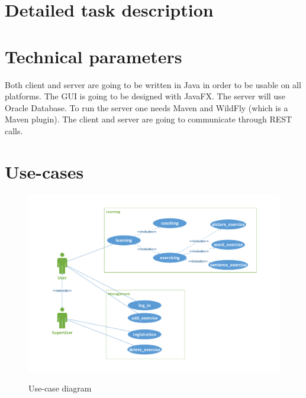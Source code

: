 \documentclass[a4paper]{article}
\begin{document}
	\section{Detailed task description}
	
	\section{Technical parameters}
	Both client and server are going to be written in Java in order to be usable on all platforms. The GUI is going to be designed with JavaFX. The server will use Oracle Database. To run the server one needs Maven and WildFly (which is a Maven plugin). The client and server are going to communicate through REST calls.
	
	\section{Use-cases}
	\begin{figure}[htbp]
		\center
		\resizebox{160mm}{!} {
			\includegraphics{figures/use-case.pdf}
		}
		\caption{Use-case diagram}
		\label{fig:use-case}
	\end{figure}

	
\end{document}
